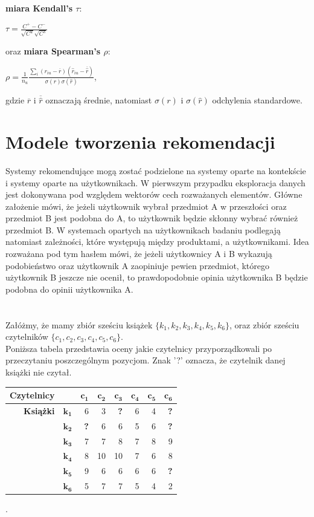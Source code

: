 \documentclass[12pt,a4paper]{report}
\begin{document}
\\\textbf{miara Kendall's $\tau$}:
\begin{center}
$\tau = \frac{C^{+} - C^{-} }{\sqrt{C^{u}}\sqrt{C^{s}}}$
\end{center}
oraz \textbf{miara Spearman's $\rho$}:
\begin{center}
$\rho = \frac{1}{n_{u}}\frac{\sum_i (r_{iu} - \overline{r})(\widehat{r}_{iu}-\overline{\widehat{r}})}{\sigma(r)\sigma(\widehat{r})}$,
\end{center}
gdzie $\overline{r}$ i $\overline{\widehat{r}}$ oznaczają średnie, natomiast $\sigma(r)$ i $\sigma(\widehat{r})$ odchylenia standardowe.




\chapter{Modele tworzenia rekomendacji}
Systemy rekomendujące mogą zostać podzielone na systemy oparte na kontekście i systemy oparte na użytkownikach. W pierwszym przypadku eksploracja danych jest dokonywana pod względem wektorów cech rozważanych elementów. Główne założenie mówi, że jeżeli użytkownik wybrał przedmiot A w przeszłości oraz przedmiot B jest podobna do A, to użytkownik będzie skłonny wybrać również przedmiot B. W systemach opartych na użytkownikach badaniu podlegają natomiast zależności, które występują między produktami, a użytkownikami. Idea rozważana pod tym hasłem mówi, że jeżeli użytkownicy A i B wykazują podobieństwo oraz użytkownik A zaopiniuje pewien przedmiot, którego użytkownik B jeszcze nie ocenił, to prawdopodobnie opinia użytkownika B będzie podobna do opinii użytkownika A.
\\
\\
\\Załóżmy, że mamy zbiór sześciu książek $\{k_1, k_2, k_3, k_4, k_5, k_6\}$, oraz zbiór sześciu czytelników $\{c_1, c_2, c_3, c_4, c_5, c_6\}$.
\\Poniższa tabela przedstawia oceny jakie czytelnicy przyporządkowali po przeczytaniu poszczególnym pozycjom. Znak '?' oznacza, że czytelnik danej książki nie czytał.
\begin{center}
\begin{tabular}{|r|r|r|r|r|r|r|r|} \hline
\textbf{Czytelnicy} & & $\mathbf{c_1}$ & $\mathbf{c_2}$ & $\mathbf{c_3}$ & $\mathbf{c_4}$ & $\mathbf{c_5}$ & $\mathbf{c_6}$\\
\hline
\hline
\textbf{Książki} &$\mathbf{k_1}$ & 6 & 3 & \textbf{?} & 6 & 4 & \textbf{?}\\
\hline
&$\mathbf{k_2}$ & \textbf{?} & 6 & 6 & 5 & 6 & \textbf{?}\\
\hline
&$\mathbf{k_3}$ & 7 & 7 & 8 & 7 & 8 & 9 \\
\hline
&$\mathbf{k_4}$ & 8 & 10 & 10 & 7 & 6 & 8\\
\hline
&$\mathbf{k_5}$ & 9 & 6 & 6 & 6 & 6 & \textbf{?} \\
\hline
&$\mathbf{k_6}$ & 5 & 7 & 7 & 5 & 4 & 2\\
\hline
\end{tabular}.
\end{center}
\end{document}
